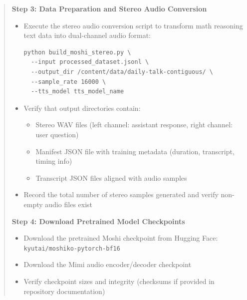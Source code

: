 \documentclass[12pt,a4paper]{article}
\begin{document}
\begin{quote}
{\textbf{Step 3: Data Preparation and Stereo Audio Conversion}
\begin{itemize}
    \item Execute the stereo audio conversion script to transform math reasoning text data into dual-channel audio format:
    \begin{verbatim}
python build_moshi_stereo.py \
  --input processed_dataset.jsonl \
  --output_dir /content/data/daily-talk-contiguous/ \
  --sample_rate 16000 \
  --tts_model tts_model_name
    \end{verbatim}
    \item Verify that output directories contain:
    \begin{itemize}
        \item Stereo WAV files (left channel: assistant response, right channel: user question)
        \item Manifest JSON file with training metadata (duration, transcript, timing info)
        \item Transcript JSON files aligned with audio samples
    \end{itemize}
    \item Record the total number of stereo samples generated and verify non-empty audio files exist
\end{itemize}

\textbf{Step 4: Download Pretrained Model Checkpoints}
\begin{itemize}
    \item Download the pretrained Moshi checkpoint from Hugging Face: \texttt{kyutai/moshiko-pytorch-bf16}
    \item Download the Mimi audio encoder/decoder checkpoint
    \item Verify checkpoint sizes and integrity (checksums if provided in repository documentation)
\end{itemize}

}
\end{quote}
\end{document}
